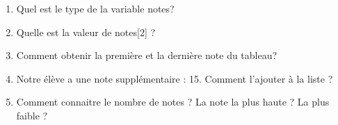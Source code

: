 \documentclass[12pt,a4paper]{article}
\newcounter{numexo}
\begin{document}
\begin{enumerate}
\item Quel est le type de la variable \textsf{notes}? \vspace{1.5cm}

\item Quelle est la valeur de \textsf{notes[2]} ? \vspace{1.5cm}

\item Comment obtenir la première et la dernière note du tableau? \vspace{3cm}

\item Notre élève a une note supplémentaire : 15. Comment l'ajouter à la liste ? \vspace{3cm}

\item Comment connaitre le nombre de notes ? La note la plus haute ? La plus faible ? \vspace{3cm}
\end{enumerate}

\newpage
\addtocounter{numexo}{1}
\end{document}
